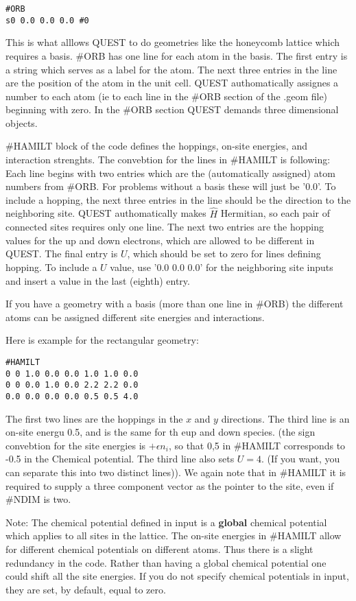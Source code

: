 \documentclass[12pt]{article}
\begin{document}
\begin{verbatim}
#ORB 
s0 0.0 0.0 0.0 #0
\end{verbatim}
This is what alllows QUEST to do geometries like the honeycomb lattice which requires a basis. \#ORB has one line for each atom in the basis. The first entry is a string which serves as a label for the atom. The next three entries in the line are the position of the atom in the unit cell. QUEST authomatically assignes a number to each atom (ie to each line in the \#ORB section of the .geom file) beginning with zero. In the \#ORB section QUEST demands three dimensional objects.

\#HAMILT block of the code defines the hoppings, on-site energies, and interaction strenghts. The convebtion for the lines in \#HAMILT is following: Each line begins with two entries which are the (automatically assigned) atom numbers from \#ORB. For problems without a basis these will just be '0.0'. To include a hopping, the next three entries in the line should be the direction to the neighboring site. QUEST authomatically makes $\hat{H}$ Hermitian, so each pair of connected sites requires only one line. The next two entries are the hopping values for the up and down electrons, which are allowed to be different in QUEST. The final entry is $U$, which should be set to zero for lines defining hopping. To include a $U$ value, use '0.0 0.0 0.0' for the neighboring site inputs and insert a value in the last (eighth) entry.

If you have a geometry with a basis (more than one line in \#ORB) the different atoms can be assigned different site energies and interactions.

Here is example for the rectangular geometry:
\begin{verbatim}
#HAMILT
0 0 1.0 0.0 0.0 1.0 1.0 0.0
0 0 0.0 1.0 0.0 2.2 2.2 0.0
0.0 0.0 0.0 0.0 0.5 0.5 4.0
\end{verbatim}
The first two lines are the hoppings in the $x$ and $y$ directions. The third line is an on-site energu 0.5, and is the same for th eup and down species. (the sign convebtion for the site energies is $+\epsilon n_i$, so that 0,5 in \#HAMILT corresponds to -0.5 in the Chemical potential. The third line also sets $U = 4$. (If you want, you can separate this into two distinct lines)). We again note that in \#HAMILT it is required to supply a three component vector as the pointer to the site, even if \#NDIM is two.

Note: The chemical potential defined in input is a \textbf{global} chemical potential which applies to all sites in the lattice. The on-site energies in \#HAMILT allow for different chemical potentials on different atoms. Thus there is a slight redundancy in the code. Rather than having a global chemical potential one could shift all the site energies. If you do not specify chemical potentials in input, they are set, by default, equal to zero.
\end{document}
